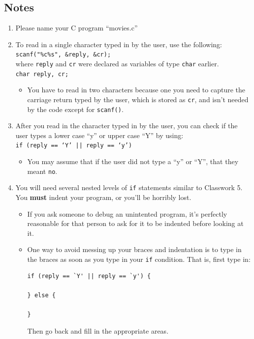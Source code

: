 \documentclass[letter,11pt]{article}
\begin{document}
\subsection*{Notes}
\begin{enumerate}
    \item Please name your C program ``movies.c''
    \item To read in a single character typed in by the user, use the following: \\
    \texttt{scanf("\%c\%s", \&reply, \&cr);} \\
    where \texttt{reply} and \texttt{cr} were declared as variables of type \texttt{char} earlier. \\
    \texttt{char reply, cr;}
    \begin{itemize}
        \item You have to read in two characters because one you need to capture the carriage return typed by the user, which is stored as \texttt{cr}, and isn't needed by the code except for \texttt{scanf()}.
    \end{itemize}
    \item After you read in the character typed in by the user, you can check if the user types a lower case ``y'' or upper case ``Y'' by using: \\
    \texttt{if (reply == `Y' || reply == `y')}
    \begin{itemize}
        \item You may assume that if the user did not type a ``y'' or ``Y'', that they meant \texttt{no}.
    \end{itemize}
    \item You will need several nested levels of \texttt{if} statements similar to Classwork 5. You \textbf{must} indent your program, or you'll be horribly lost.
    \begin{itemize}
        \item If you ask someone to debug an unintented program, it's perfectly reasonable for that person to ask for it to be indented before looking at it.
        \item One way to avoid messing up your braces and indentation is to type in the braces as soon as you type in your \texttt{if} condition. That is, first type in:
        \begin{verbatim}
if (reply == `Y' || reply == `y') {

} else {

}
        \end{verbatim}Then go back and fill in the appropriate areas.
    \end{itemize}
\end{enumerate}
\end{document}
